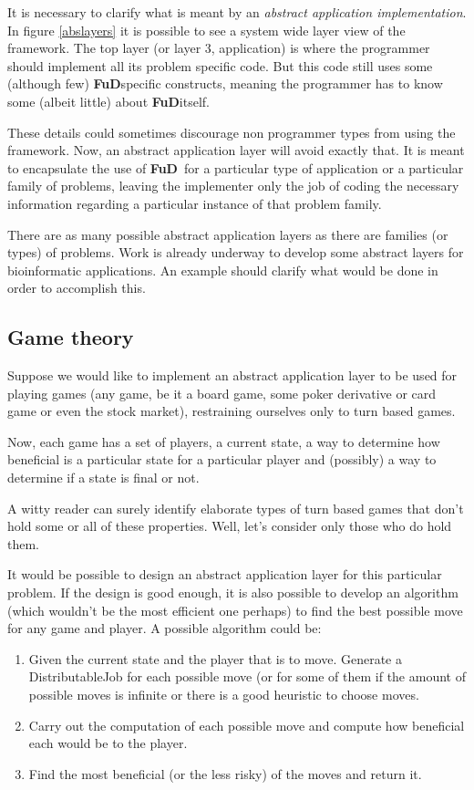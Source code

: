\documentclass[a4paper,12pt,english]{report}
\newcommand{\fud}{\textbf{FuD}}
\begin{document}
It is necessary to clarify what is meant by an \emph{abstract application implementation}. In figure \ref{abslayers} it is possible to see a system wide layer view of the framework. The top layer (or layer 3, application) is where the programmer should implement all its problem specific code. But this code still uses some (although few) \fud specific constructs, meaning the programmer has to know some (albeit little) about \fud itself. 

These details could sometimes discourage non programmer types from using the framework. Now, an abstract application layer will avoid exactly that. It is meant to encapsulate the use of \fud \ for a particular type of application or a particular family of problems, leaving the implementer only the job of coding the necessary information regarding a particular instance of that problem family.

There are as many possible abstract application layers as there are families (or types) of problems. Work is already underway to develop some abstract layers for bioinformatic applications. An example should clarify what would be done in order to accomplish this.

\subsection{Game theory}

Suppose we would like to implement an abstract application layer to be used for playing games (any game, be it a board game, some poker derivative or card game or even the stock market), restraining ourselves only to turn based games. 

Now, each game has a set of players, a current state, a way to determine how beneficial is a particular state for a particular player and (possibly) a way to determine if a state is final or not.

A witty reader can surely identify elaborate types of turn based games that don't hold some or all of these properties. Well, let's consider only those who do hold them.

It would be possible to design an abstract application layer for this particular problem. If the design is good enough, it is also possible to develop an algorithm (which wouldn't be the most efficient one perhaps) to find the best possible move for any game and player. A possible algorithm could be:
\begin{enumerate}
\item Given the current state and the player that is to move. Generate a DistributableJob for each possible move (or for some of them if the amount of possible moves is infinite or there is a good heuristic to choose moves.
\item Carry out the computation of each possible move and compute how beneficial each would be to the player.
\item Find the most beneficial (or the less risky) of the moves and return it.
\end{enumerate}
\end{document}
